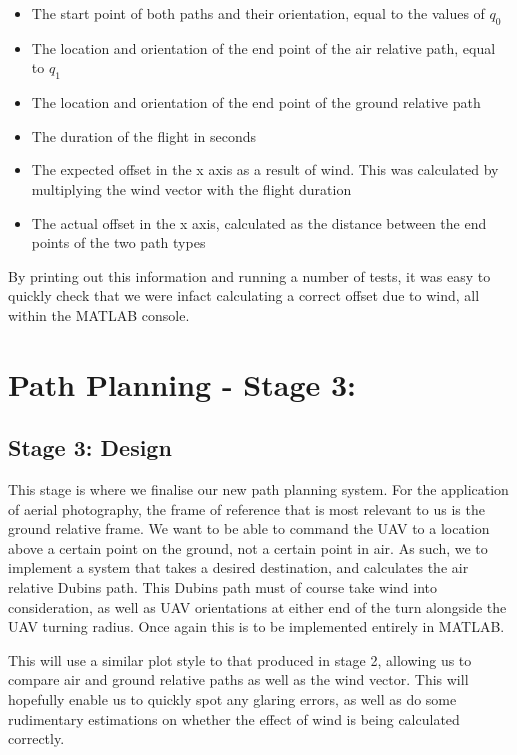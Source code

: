 \begin{itemize}
	\item The start point of both paths and their orientation, equal to the values of $q_0$
	\item The location and orientation of the end point of the air relative path, equal to $q_1$
	\item The location and orientation of the end point of the ground relative path
	\item The duration of the flight in seconds
	\item The expected offset in the x axis as a result of wind. This was calculated by multiplying the wind vector with the flight duration
	\item The actual offset in the x axis, calculated as the distance between the end points of the two path types
\end{itemize}

By printing out this information and running a number of tests, it was easy to quickly check that we were infact calculating a correct offset due to wind, all within the MATLAB console. 

\section{Path Planning - Stage 3: }
\label{task1:stage3}

\subsection{Stage 3: Design}
\label{task1:stage3:design}


This stage is where we finalise our new path planning system. For the application of aerial photography, the frame of reference that is most relevant to us is the ground relative frame. We want to be able to command the UAV to a location above a certain point on the ground, not a certain point in air. As such, we to implement a system that takes a desired destination, and calculates the air relative Dubins path. This Dubins path must of course take wind into consideration, as well as UAV orientations at either end of the turn alongside the UAV turning radius. Once again this is to be implemented entirely in MATLAB. 

This will use a similar plot style to that produced in stage 2, allowing us to compare air and ground relative paths as well as the wind vector. This will hopefully enable us to quickly spot any glaring errors, as well as do some rudimentary estimations on whether the effect of wind is being calculated correctly.

